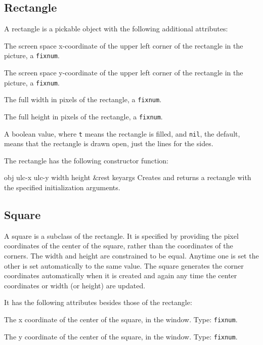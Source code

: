 \documentclass[twoside,openright,11pt]{report}
\newcommand{\tp}[1]{\texttt{#1}}
\begin{document}
\subsection{Rectangle}

A rectangle is a pickable object with the following
additional attributes:

{The screen space x-coordinate of the upper left corner of the
rectangle in the picture, a \tp{fixnum}.}

{The screen space y-coordinate of the upper left corner of the
rectangle in the picture, a \tp{fixnum}.}

{The full width in pixels of the rectangle, a \tp{fixnum}.}

{The full height in pixels of the rectangle, a \tp{fixnum}.}

{A boolean value, where \tp{t} means the rectangle is filled, and
\tp{nil}, the default, means that the rectangle is drawn open,
just the lines for the sides.}

The rectangle has the following constructor function:

{obj ulc-x ulc-y width height \&rest keyargs}
{Creates and returns a rectangle with the specified initialization
arguments.}

\subsection{Square}

A square is a subclass of the rectangle.  It is
specified by providing the pixel coordinates of the center of the
square, rather than the coordinates of the corners.  The width and
height are constrained to be equal.  Anytime one is set the other is
set automatically to the same value.  The square generates the corner
coordinates automatically when it is created and again any time the
center coordinates or width (or height) are updated.

It has the following attributes besides those of the rectangle:

{The x coordinate of the center of the square, in the window.  Type:
\tp{fixnum}.}

{The y coordinate of the center of the square, in the window.  Type:
\tp{fixnum}.}
\end{document}
